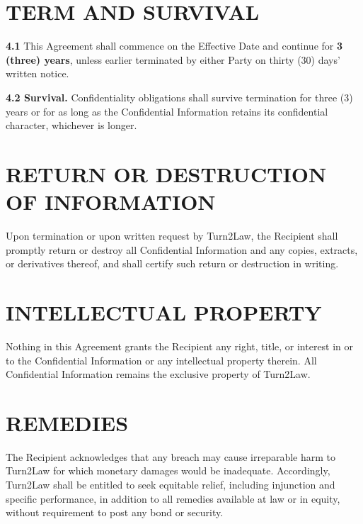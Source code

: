 \documentclass[10pt]{article}
\begin{document}
\section{TERM AND SURVIVAL}

\textbf{4.1} This Agreement shall commence on the Effective Date and continue for \textbf{3 (three) years}, unless earlier terminated by either Party on thirty (30) days' written notice.

\textbf{4.2 Survival.} Confidentiality obligations shall survive termination for three (3) years or for as long as the Confidential Information retains its confidential character, whichever is longer.

\section{RETURN OR DESTRUCTION OF INFORMATION}

Upon termination or upon written request by Turn2Law, the Recipient shall promptly return or destroy all Confidential Information and any copies, extracts, or derivatives thereof, and shall certify such return or destruction in writing.

\section{INTELLECTUAL PROPERTY}

Nothing in this Agreement grants the Recipient any right, title, or interest in or to the Confidential Information or any intellectual property therein. All Confidential Information remains the exclusive property of Turn2Law.

\section{REMEDIES}

The Recipient acknowledges that any breach may cause irreparable harm to Turn2Law for which monetary damages would be inadequate. Accordingly, Turn2Law shall be entitled to seek equitable relief, including injunction and specific performance, in addition to all remedies available at law or in equity, without requirement to post any bond or security.
\end{document}
